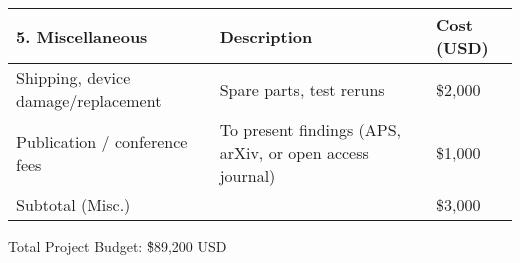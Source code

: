 \begin{table}
    \centering
    \footnotesize
    \begin{tabular}{lll}
        \toprule
        \textbf{5. Miscellaneous} & \textbf{Description} & \textbf{Cost (USD)} \\
        \midrule
        Shipping, device damage/replacement & Spare parts, test reruns & \$2,000 \\
        Publication / conference fees & To present findings (APS, arXiv, or open access journal) & \$1,000 \\
        Subtotal (Misc.) &  & \$3,000 \\
        \bottomrule
    \end{tabular}
    \caption{}
    \label{tab:misc}
\end{table}

Total Project Budget: \~\$89,200 USD



